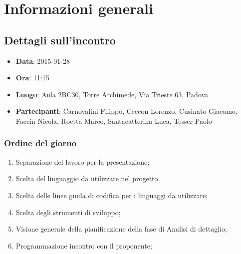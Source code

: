 %



\section{Informazioni generali} %
\label{sec:informazioni_generali}
	\subsection{Dettagli sull'incontro} %
	\label{sub:dettagli_sull_incontro}
		\begin{itemize}
			\item \textbf{Data}: 2015-01-28
			\item \textbf{Ora}: 11:15
			\item \textbf{Luogo}: Aula 2BC30, Torre Archimede, Via Trieste 63, Padova
			\item \textbf{Partecipanti}: Carnovalini Filippo, Ceccon Lorenzo, Cusinato Giacomo, Faccin Nicola, Roetta Marco, Santacatterina Luca, Tesser Paolo
		\end{itemize}

	\subsubsection{Ordine del giorno} %
	\label{ssub:ordine_del_giorno}
		\begin{enumerate}
			\item Separazione del lavoro per la presentazione;
			\item Scelta del linguaggio da utilizzare nel progetto
			\item Scelta delle linee guida di codifica per i linguaggi da utilizzare;
			\item Scelta degli strumenti di sviluppo;
			\item Visione generale della pianificazione della fase di Analisi di dettaglio;
			\item Programmazione incontro con il proponente;
		\end{enumerate}
	
	
